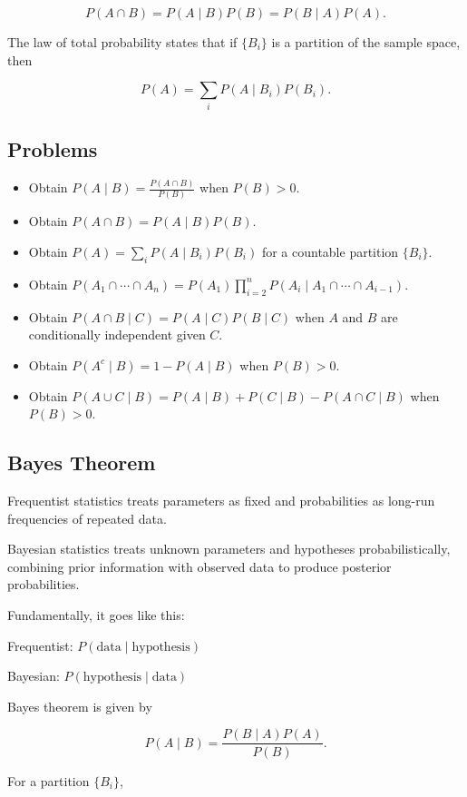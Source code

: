 \documentclass{article}
\begin{document}
$$
P(A\cap B)=P(A\mid B)P(B)=P(B\mid A)P(A).
$$

The law of total probability states that if $\{B_i\}$ is a partition of the sample space, then

$$
P(A)=\sum_i P(A\mid B_i)P(B_i).
$$

\subsection{Problems}

\begin{itemize}
    \item Obtain $P(A\mid B)=\frac{P(A\cap B)}{P(B)}$ when $P(B)>0$.
    \item Obtain $P(A\cap B)=P(A\mid B)P(B)$.
    \item Obtain $P(A)=\sum_i P(A\mid B_i)P(B_i)$ for a countable partition $\{B_i\}$.
    \item Obtain $P(A_1\cap\cdots\cap A_n)=P(A_1)\prod_{i=2}^n P(A_i\mid A_1\cap\cdots\cap A_{i-1})$.
    \item Obtain $P(A\cap B\mid C)=P(A\mid C)P(B\mid C)$ when $A$ and $B$ are conditionally independent given $C$.
    \item Obtain $P(A^c\mid B)=1-P(A\mid B)$ when $P(B)>0$.
    \item Obtain $P(A\cup C\mid B)=P(A\mid B)+P(C\mid B)-P(A\cap C\mid B)$ when $P(B)>0$.
\end{itemize}

\subsection{Bayes Theorem}
Frequentist statistics treats parameters as fixed and probabilities as long-run frequencies of repeated data.

Bayesian statistics treats unknown parameters and hypotheses probabilistically, combining prior information with observed data to produce posterior probabilities.

Fundamentally, it goes like this:

Frequentist: $P(\text{data}\mid\text{hypothesis})$

Bayesian: $P(\text{hypothesis}\mid\text{data})$

Bayes theorem is given by

$$
P(A\mid B)=\frac{P(B\mid A)P(A)}{P(B)}.
$$

For a partition $\{B_i\}$,
\end{document}
